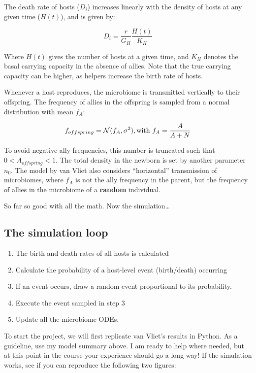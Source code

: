 \documentclass[
  letterpaper,
  DIV=11,
  numbers=noendperiod]{scrreprt}
\theoremstyle{definition}
\theoremstyle{remark}
\begin{document}
\begin{tcolorbox}
The death rate of hosts (\(D_i\)) increases linearly with the density of
hosts at any given time (\(H(t)\)), and is given by:

\[
D_i = \frac{r}{G_H} \frac{H(t)}{K_H}
\]

Where \(H(t)\) gives the number of hosts at a given time, and \(K_H\)
denotes the basal carrying capacity in the absence of allies. Note that
the true carrying capacity can be higher, as helpers increase the birth
rate of hosts.

Whenever a host reproduces, the microbiome is transmitted vertically to
their offspring. The frequency of allies in the offspring is sampled
from a normal distribution with mean \(f_A\):

\[
f_{offspring}  = \mathcal{N} (f_{A},\sigma^2),
\\\text{with } f_A = \frac{A}{A+N}
\]

To avoid negative ally frequencies, this number is truncated such that
\(0<A_{offspring}<1\). The total density in the newborn is set by
another parameter \(n_0\). The model by van Vliet also considers
``horizontal'' transmission of microbiomes, where \(f_A\) is not the
ally frequency in the parent, but the frequency of allies in the
microbiome of a \textbf{random} individual.

So far so good with all the math. Now the simulation\ldots{}

\subsection{The simulation loop}\label{the-simulation-loop}

\begin{enumerate}
\def\labelenumi{\arabic{enumi}.}
\item
  The birth and death rates of all hosts is calculated
\item
  Calculate the probability of a host-level event (birth/death)
  occurring
\item
  If an event occurs, draw a random event proportional to its
  probability.
\item
  Execute the event sampled in step 3
\item
  Update all the microbiome ODEs.
\end{enumerate}

\end{tcolorbox}

To start the project, we will first replicate van Vliet's results in
Python. As a guideline, use my model summary above. I am ready to help
where needed, but at this point in the course your experience should go
a long way! If the simulation works, see if you can reproduce the
following two figures:
\end{document}
